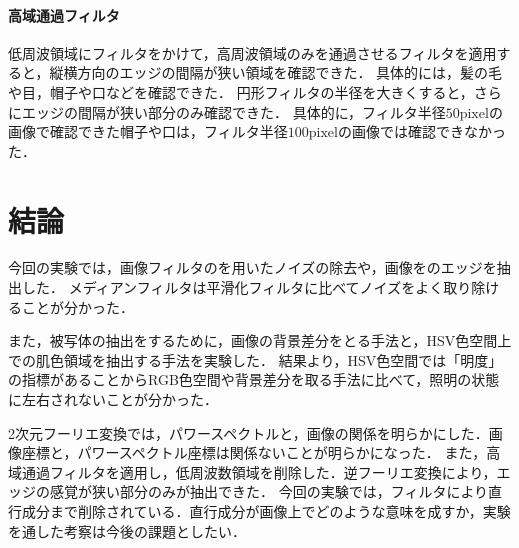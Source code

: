 \paragraph{高域通過フィルタ}
低周波領域にフィルタをかけて，高周波領域のみを通過させるフィルタを適用すると，縦横方向のエッジの間隔が狭い領域を確認できた．
具体的には，髪の毛や目，帽子や口などを確認できた．
円形フィルタの半径を大きくすると，さらにエッジの間隔が狭い部分のみ確認できた．
具体的に，フィルタ半径\(50\textrm{pixel}\)の画像で確認できた帽子や口は，フィルタ半径\(100\textrm{pixel}\)の画像では確認できなかった．
\section{結論}
今回の実験では，画像フィルタのを用いたノイズの除去や，画像をのエッジを抽出した．
メディアンフィルタは平滑化フィルタに比べてノイズをよく取り除けることが分かった．\par
また，被写体の抽出をするために，画像の背景差分をとる手法と，HSV色空間上での肌色領域を抽出する手法を実験した．
結果より，HSV色空間では「明度」の指標があることからRGB色空間や背景差分を取る手法に比べて，照明の状態に左右されないことが分かった．\par
2次元フーリエ変換では，パワースペクトルと，画像の関係を明らかにした．画像座標と，パワースペクトル座標は関係ないことが明らかになった．
また，高域通過フィルタを適用し，低周波数領域を削除した．逆フーリエ変換により，エッジの感覚が狭い部分のみが抽出できた．
今回の実験では，フィルタにより直行成分まで削除されている．直行成分が画像上でどのような意味を成すか，実験を通した考察は今後の課題としたい．